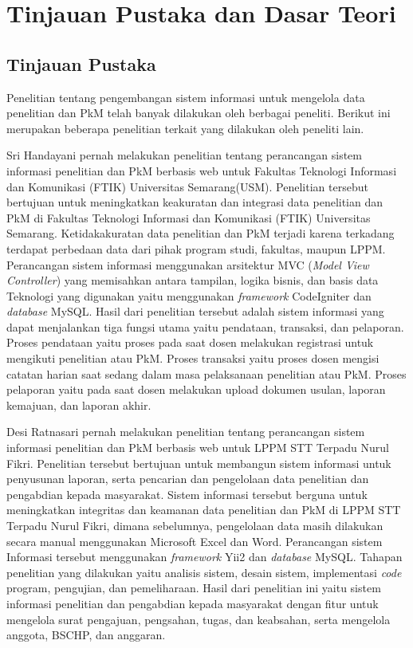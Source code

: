 \chapter{Tinjauan Pustaka dan Dasar Teori}

\section{Tinjauan Pustaka}

Penelitian tentang pengembangan sistem informasi untuk mengelola data penelitian dan PkM 
telah banyak dilakukan oleh berbagai peneliti. Berikut ini merupakan beberapa penelitian 
terkait yang dilakukan oleh peneliti lain.

Sri Handayani pernah melakukan penelitian tentang perancangan sistem informasi penelitian dan
PkM berbasis web untuk Fakultas Teknologi Informasi dan Komunikasi (FTIK) Universitas Semarang(USM). Penelitian tersebut bertujuan untuk
meningkatkan keakuratan dan integrasi data penelitian dan PkM di Fakultas Teknologi Informasi dan Komunikasi (FTIK) Universitas Semarang. Ketidakakuratan data 
penelitian dan PkM terjadi karena terkadang terdapat perbedaan data dari pihak program studi, 
fakultas, maupun LPPM. Perancangan sistem informasi menggunakan arsitektur
MVC (\textit{Model View Controller}) yang memisahkan antara tampilan, logika bisnis, dan basis data
Teknologi yang digunakan yaitu menggunakan \textit{framework} CodeIgniter dan \textit{database} MySQL.
Hasil dari penelitian tersebut adalah sistem informasi yang dapat menjalankan tiga fungsi utama
yaitu pendataan, transaksi, dan pelaporan. Proses pendataan yaitu proses pada saat dosen melakukan 
registrasi untuk mengikuti penelitian atau PkM. Proses transaksi yaitu proses dosen mengisi
catatan harian saat sedang dalam masa pelaksanaan penelitian atau PkM. Proses pelaporan yaitu
pada saat dosen melakukan upload dokumen usulan, laporan kemajuan, dan laporan akhir\cite{handayani_rancang_nodate}.

Desi Ratnasari pernah melakukan penelitian tentang perancangan sistem informasi penelitian dan
PkM berbasis web untuk LPPM STT Terpadu Nurul Fikri. Penelitian tersebut bertujuan untuk 
membangun sistem informasi untuk penyusunan laporan, serta pencarian dan pengelolaan data 
penelitian dan pengabdian kepada masyarakat. Sistem informasi tersebut berguna untuk 
meningkatkan integritas dan keamanan data penelitian dan PkM di LPPM STT Terpadu Nurul Fikri,
dimana sebelumnya, pengelolaan data masih dilakukan secara manual menggunakan Microsoft Excel dan Word. 
Perancangan sistem Informasi tersebut menggunakan \textit{framework} Yii2 dan \textit{database} MySQL.
Tahapan penelitian yang dilakukan yaitu analisis sistem, desain sistem, implementasi 
\textit{code} program, pengujian, dan pemeliharaan. Hasil dari penelitian ini yaitu sistem 
informasi penelitian dan pengabdian kepada masyarakat dengan fitur untuk mengelola surat 
pengajuan, pengsahan, tugas, dan keabsahan, serta mengelola anggota, BSCHP, dan anggaran\cite{ratnasari_analisis_2017}.

